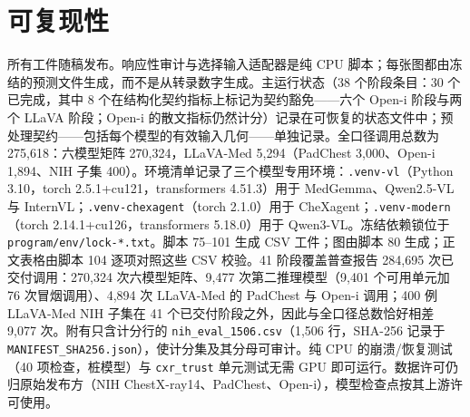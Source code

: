 \section*{可复现性}

所有工件随稿发布。响应性审计与选择输入适配器是纯 CPU 脚本；每张图都由冻结的预测文件生成，而不是从转录数字生成。主运行状态（38 个阶段条目：30 个已完成，其中 8 个在结构化契约指标上标记为契约豁免——六个 Open-i 阶段与两个 LLaVA 阶段；Open-i 的散文指标仍然计分）记录在可恢复的状态文件中；预处理契约——包括每个模型的有效输入几何——单独记录。全口径调用总数为 275,618：六模型矩阵 270,324，LLaVA-Med 5,294（PadChest 3,000、Open-i 1,894、NIH 子集 400）。环境清单记录了三个模型专用环境：\texttt{.venv-vl}（Python 3.10，torch 2.5.1+cu121，transformers 4.51.3）用于 MedGemma、Qwen2.5-VL 与 InternVL；\texttt{.venv-chexagent}（torch 2.1.0）用于 CheXagent；\texttt{.venv-modern}（torch 2.14.1+cu126，transformers 5.18.0）用于 Qwen3-VL。冻结依赖锁位于 \texttt{program/env/lock-*.txt}。脚本 75--101 生成 CSV 工件；图由脚本 80 生成；正文表格由脚本 104 逐项对照这些 CSV 校验。41 阶段覆盖普查报告 284,695 次已交付调用：270,324 次六模型矩阵、9,477 次第二推理模型（9,401 个可用单元加 76 次冒烟调用）、4,894 次 LLaVA-Med 的 PadChest 与 Open-i 调用；400 例 LLaVA-Med NIH 子集在 41 个已交付阶段之外，因此与全口径总数恰好相差 9,077 次。附有只含计分行的 \texttt{nih\_eval\_1506.csv}（1,506 行，SHA-256 记录于 \texttt{MANIFEST\_SHA256.json}），使计分集及其分母可审计。纯 CPU 的崩溃/恢复测试（40 项检查，桩模型）与 \texttt{cxr\_trust} 单元测试无需 GPU 即可运行。数据许可仍归原始发布方（NIH ChestX-ray14、PadChest、Open-i），模型检查点按其上游许可使用。
